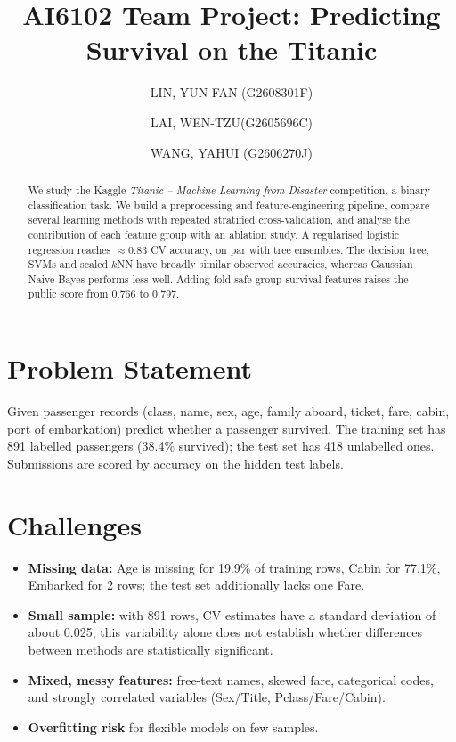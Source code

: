 \documentclass[10pt,twocolumn]{article}
\title{AI6102 Team Project: Predicting Survival on the Titanic}
\author{%
  LIN, YUN-FAN (G2608301F) \and LAI, WEN-TZU(G2605696C) \and WANG, YAHUI (G2606270J)\\
}
\date{}
\begin{document}
\maketitle

\begin{abstract}
We study the Kaggle \emph{Titanic -- Machine Learning from Disaster} competition, a binary classification task.
We build a preprocessing and feature-engineering pipeline, compare several learning methods with repeated
stratified cross-validation, and analyse the contribution of each feature group with an ablation study.
A regularised logistic regression reaches $\approx$0.83 CV accuracy, on par with tree ensembles.
The decision tree, SVMs and scaled $k$NN have broadly similar observed accuracies, whereas Gaussian Naive Bayes performs less well.
Adding fold-safe group-survival features raises the public score from 0.766 to 0.797.

\end{abstract}

\section{Problem Statement}
Given passenger records (class, name, sex, age, family aboard, ticket, fare, cabin, port of embarkation) predict whether a
passenger survived. The training set has 891 labelled passengers (38.4\% survived); the test set has 418 unlabelled ones.
Submissions are scored by accuracy on the hidden test labels.

\section{Challenges}
\begin{itemize}
  \item \textbf{Missing data:} Age is missing for 19.9\% of training rows, Cabin for 77.1\%, Embarked for 2 rows; the test set additionally lacks one Fare.
  \item \textbf{Small sample:} with 891 rows, CV estimates have a standard deviation of about 0.025; this variability alone does not establish whether differences between methods are statistically significant.
  \item \textbf{Mixed, messy features:} free-text names, skewed fare, categorical codes, and strongly correlated variables (Sex/Title, Pclass/Fare/Cabin).
  \item \textbf{Overfitting risk} for flexible models on few samples.
\end{itemize}
\end{document}
